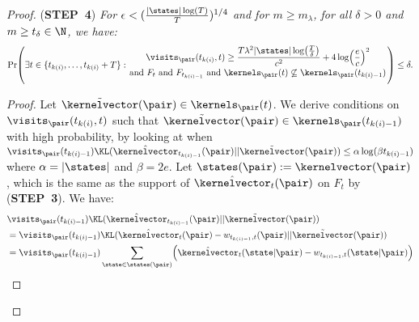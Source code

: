 \documentclass[preprint,cleveref,12pt]{colt2025}
\DeclarePairedDelimiter{\braces}{\{}{\}}	%
\DeclarePairedDelimiter{\parens}{(}{)}	%
\DeclarePairedDelimiter{\abs}{\lvert}{\rvert}	%
\def\kernel{\kernelvector}
\def\STEP#1{(\strong{STEP~#1})}
\newcommand{\strong}[1]{\textbf{#1}}
\begin{document}
\begin{proof}
        \noindent
        \STEP{4}
        \textit{
            For $\epsilon < (\frac{\abs{\states} \log(T)}T)^{1/4}$ and for $m \ge m_\lambda$, for all $\delta > 0$ and $m \ge t_\delta \in \N$, we have:
            \begin{equation*}
                \Pr \parens*{
                    \exists t \in \braces{t_{k(i)}, \ldots, t_{k(i)}+T}
                    :
                    {
                        \displaystyle
                        \visits_\pair(t_{k(i)}, t) 
                        \ge
                        \frac{T \lambda^2 \abs{\states} \log\parens*{\tfrac T\delta}}{c^2}
                        +
                        4 \log \parens*{\frac ec}^2
                        \atop
                        \text{and~}
                        F_t
                        \text{~and~}
                        F_{t_{k(i)-1}}
                        \text{~and~}
                        \kernels_\pair(t) \not \subseteq \kernels_\pair(t_{k(i)-1})
                    }
                }
                \le \delta
                .
            \end{equation*}
        }
        \begin{proof}
            Let $\tilde{\kernel}(\pair) \in \kernels_\pair(t)$. 
            We derive conditions on $\visits_\pair (t_{k(i)}, t)$ such that $\tilde{\kernel}(\pair) \in \kernels_\pair(t_{k(i)-1})$ with high probability, by looking at when $\visits_{\pair}(t_{k(i)-1}) \KL(\hat{\kernel}_{t_{k(i)-1}}(\pair)||\tilde{\kernel}(\pair)) \le \alpha \log (\beta t_{k(i)-1})$ where $\alpha = \abs{\states}$ and $\beta = 2e$.
            Let $\states(\pair) := \kernel(\pair)$, which is the same as the support of $\hat{\kernel}_t(\pair)$ on $F_t$ by \STEP{3}.
            We have:
            \begin{align}
                & \notag
                \visits_\pair (t_{k(i)-1}) 
                \KL(\hat{\kernel}_{t_{k(i)-1}}(\pair)||\tilde{\kernel}(\pair))
                \\
                & = \notag
                \visits_\pair (t_{k(i)-1})
                \KL(
                    \hat{\kernel}_{t}(\pair) - w_{t_{k(i)-1}, t}(\pair)
                    ||
                    \tilde{\kernel}(\pair)
                )
                \\
                & = \notag
                \visits_\pair (t_{k(i)-1})
                \sum_{\state \in \states(\pair)}
                \parens*{
                    \hat{\kernel}_t(\state|\pair) - w_{t_{k(i)-1}, t}(\state|\pair)
}
\end{align}
\end{proof}
\end{proof}
\end{document}
